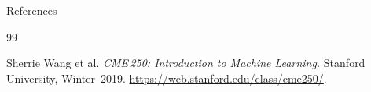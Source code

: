 \begin{frame}[allowframebreaks]{References}
\begin{thebibliography}{99}

Sherrie Wang et al. \emph{CME\,250: Introduction to Machine Learning.} Stanford University, Winter 2019. \href{https://web.stanford.edu/class/cme250/}{https://web.stanford.edu/class/cme250/}.

\end{thebibliography}
\end{frame}
